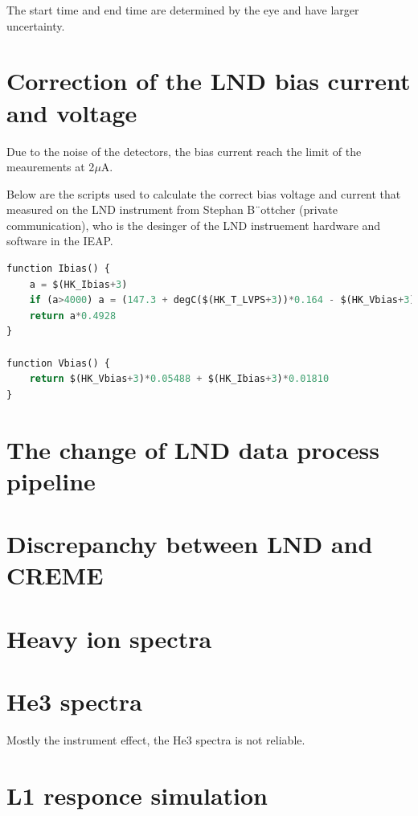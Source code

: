 The start time and end time are determined by the eye and have larger uncertainty. 

\section{Correction of the LND bias current and voltage}

Due to the noise of the detectors, the bias current reach the limit of the meaurements at 2$\mu$A. 

Below are the scripts used to calculate the correct bias voltage and current that measured on the LND instrument from Stephan B¨ottcher (private communication), who is the desinger of the LND instruement hardware and software in the IEAP.
\begin{lstlisting}[language=Python]
function Ibias() {
    a = $(HK_Ibias+3)
    if (a>4000) a = (147.3 + degC($(HK_T_LVPS+3))*0.164 - $(HK_Vbias+3)*0.05488) / 0.01810
    return a*0.4928
}

function Vbias() {
    return $(HK_Vbias+3)*0.05488 + $(HK_Ibias+3)*0.01810
}

\end{lstlisting}

\section{The change of \ac{LND} data process pipeline}
\label{chp:appendix_LND_data_process_pipeline}

\section{Discrepanchy between LND and CREME}

\section{Heavy ion spectra}

\section{He3 spectra}
\label{chp:appendix_LND_He3_spectra}
Mostly the instrument effect, the He3 spectra is not reliable.

\section{L1 responce simulation}


